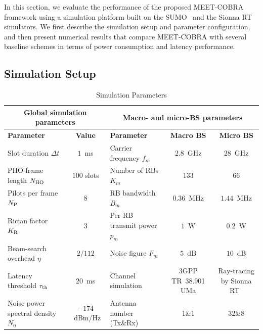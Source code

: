 \documentclass[conference, a4paper]{IEEEtran}
\theoremstyle{remark}
\begin{document}
In this section, we evaluate the performance of the proposed MEET-COBRA framework using a simulation platform built on the SUMO~\cite{behrisch2011sumo} and the Sionna RT~\cite{sionnaRT} simulators.
We first describe the simulation setup and parameter configuration, and then present numerical results that compare MEET-COBRA with several baseline schemes in terms of power consumption and latency performance.

\subsection{Simulation Setup}

\begin{table}[htbp]
    \centering
    \caption{Simulation Parameters}
    \label{tab:sim-params}
    \begin{tabular}{l c | l c c}
        \hline
        \multicolumn{2}{c|}{\textbf{Global simulation parameters}}
        & \multicolumn{3}{c}{\textbf{Macro- and micro-BS parameters}} \\
        \hline
        \textbf{Parameter} & \textbf{Value}
        & \textbf{Parameter} & \textbf{Macro BS} & \textbf{Micro BS} \\
        \hline
        Slot duration $\Delta t$ & $1$~ms
        & Carrier frequency $f_m$ & $2.8$~GHz & $28$~GHz \\

        PHO frame length $N_{\rm HO}$ & $100$ slots
        & Number of RBs $K_m$ & $133$ & $66$ \\

        Pilots per frame $N_{\rm P}$ & $8$
        & RB bandwidth $B_m$ & $0.36$~MHz & $1.44$~MHz \\

        Rician factor $K_{\rm R}$ & $3$
        & Per-RB transmit power $p_m$ & $1$~W & $0.2$~W \\

        Beam-search overhead $\eta$ & $2/112$
        & Noise figure $F_m$ & $5$~dB & $10$~dB \\

        Latency threshold $\tau_{\rm th}$ & $20$~ms
        & Channel simulation &
        3GPP TR~38.901 UMa & Ray-tracing by Sionna RT~\cite{sionnaRT} \\

        Noise power spectral density $N_0$ & $-174$~dBm/Hz
        & Antenna number (Tx\&Rx) & 1\&1 & 32\&8 \\
        \hline
    \end{tabular}
\end{table}
\end{document}
